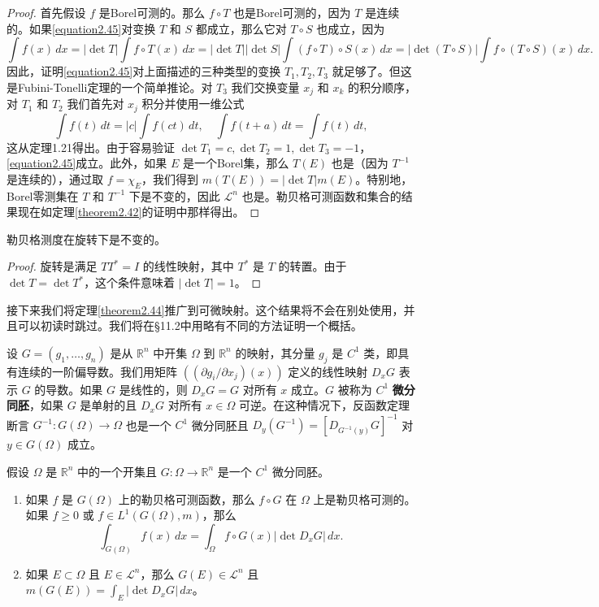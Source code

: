 \documentclass[lang=cn,10pt,thmcnt=section]{elegantbook}
\begin{document}
\begin{proof}
首先假设 $f$ 是Borel可测的。那么 $f \circ T$ 也是Borel可测的，因为 $T$ 是连续的。如果\eqref{equation2.45}对变换 $T$ 和 $S$ 都成立，那么它对 $T \circ S$ 也成立，因为
\[ \int f(x) \,dx = |\det T| \int f \circ T(x) \,dx = |\det T| |\det S| \int (f \circ T) \circ S(x) \,dx = |\det(T \circ S)| \int f \circ (T \circ S)(x) \,dx. \]
因此，证明\eqref{equation2.45}对上面描述的三种类型的变换 $T_1, T_2, T_3$ 就足够了。但这是Fubini-Tonelli定理的一个简单推论。对 $T_3$ 我们交换变量 $x_j$ 和 $x_k$ 的积分顺序，对 $T_1$ 和 $T_2$ 我们首先对 $x_j$ 积分并使用一维公式
\[ \int f(t) \,dt = |c| \int f(ct) \,dt, \quad \int f(t+a) \,dt = \int f(t) \,dt, \]
这从定理1.21得出。由于容易验证 $\det T_1 = c, \det T_2 = 1, \det T_3 = -1$，\eqref{equation2.45}成立。此外，如果 $E$ 是一个Borel集，那么 $T(E)$ 也是（因为 $T^{-1}$ 是连续的），通过取 $f=\chi_E$，我们得到 $m(T(E)) = |\det T|m(E)$。特别地，Borel零测集在 $T$ 和 $T^{-1}$ 下是不变的，因此 $\mathcal{L}^n$ 也是。勒贝格可测函数和集合的结果现在如定理\ref{theorem2.42}的证明中那样得出。
\end{proof}

\begin{corollary}\label{corollary2.46}
勒贝格测度在旋转下是不变的。
\end{corollary}

\begin{proof}
旋转是满足 $TT^*=I$ 的线性映射，其中 $T^*$ 是 $T$ 的转置。由于 $\det T = \det T^*$，这个条件意味着 $|\det T|=1$。
\end{proof}

接下来我们将定理\ref{theorem2.44}推广到可微映射。这个结果将不会在别处使用，并且可以初读时跳过。我们将在§11.2中用略有不同的方法证明一个概括。

设 $G = (g_1, \ldots, g_n)$ 是从 $\mathbb{R}^n$ 中开集 $\Omega$ 到 $\mathbb{R}^n$ 的映射，其分量 $g_j$ 是 $C^1$ 类，即具有连续的一阶偏导数。我们用矩阵 $((\partial g_i / \partial x_j)(x))$ 定义的线性映射 $D_x G$ 表示 $G$ 的导数。如果 $G$ 是线性的，则 $D_x G = G$ 对所有 $x$ 成立。$G$ 被称为 $C^1$ \textbf{微分同胚}，如果 $G$ 是单射的且 $D_x G$ 对所有 $x \in \Omega$ 可逆。在这种情况下，反函数定理断言 $G^{-1} : G(\Omega) \to \Omega$ 也是一个 $C^1$ 微分同胚且 $D_y(G^{-1}) = [D_{G^{-1}(y)}G]^{-1}$ 对 $y \in G(\Omega)$ 成立。

\begin{theorem}\label{theorem2.47}
假设 $\Omega$ 是 $\mathbb{R}^n$ 中的一个开集且 $G : \Omega \to \mathbb{R}^n$ 是一个 $C^1$ 微分同胚。
\begin{enumerate}[label=\alph*.]
\item 如果 $f$ 是 $G(\Omega)$ 上的勒贝格可测函数，那么 $f \circ G$ 在 $\Omega$ 上是勒贝格可测的。如果 $f \geq 0$ 或 $f \in L^1(G(\Omega), m)$，那么
\[ \int_{G(\Omega)} f(x) \,dx = \int_{\Omega} f \circ G(x) |\det D_x G| \,dx. \]
\item 如果 $E \subset \Omega$ 且 $E \in \mathcal{L}^n$，那么 $G(E) \in \mathcal{L}^n$ 且 $m(G(E)) = \int_E |\det D_x G| \,dx$。
\end{enumerate}
\end{theorem}
\end{document}

